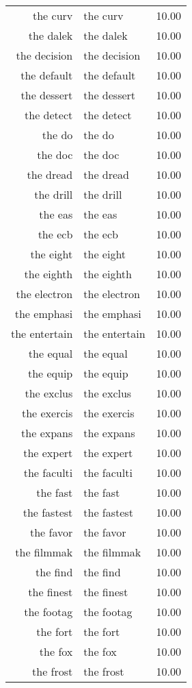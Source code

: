 \begin{table}[ht]
\begin{tabular}{rlr}
  the curv & the curv & 10.00 \\ 
  the dalek & the dalek & 10.00 \\ 
  the decision & the decision & 10.00 \\ 
  the default & the default & 10.00 \\ 
  the dessert & the dessert & 10.00 \\ 
  the detect & the detect & 10.00 \\ 
  the do & the do & 10.00 \\ 
  the doc & the doc & 10.00 \\ 
  the dread & the dread & 10.00 \\ 
  the drill & the drill & 10.00 \\ 
  the eas & the eas & 10.00 \\ 
  the ecb & the ecb & 10.00 \\ 
  the eight & the eight & 10.00 \\ 
  the eighth & the eighth & 10.00 \\ 
  the electron & the electron & 10.00 \\ 
  the emphasi & the emphasi & 10.00 \\ 
  the entertain & the entertain & 10.00 \\ 
  the equal & the equal & 10.00 \\ 
  the equip & the equip & 10.00 \\ 
  the exclus & the exclus & 10.00 \\ 
  the exercis & the exercis & 10.00 \\ 
  the expans & the expans & 10.00 \\ 
  the expert & the expert & 10.00 \\ 
  the faculti & the faculti & 10.00 \\ 
  the fast & the fast & 10.00 \\ 
  the fastest & the fastest & 10.00 \\ 
  the favor & the favor & 10.00 \\ 
  the filmmak & the filmmak & 10.00 \\ 
  the find & the find & 10.00 \\ 
  the finest & the finest & 10.00 \\ 
  the footag & the footag & 10.00 \\ 
  the fort & the fort & 10.00 \\ 
  the fox & the fox & 10.00 \\ 
  the frost & the frost & 10.00 \\ 

\end{tabular}
\end{table}
